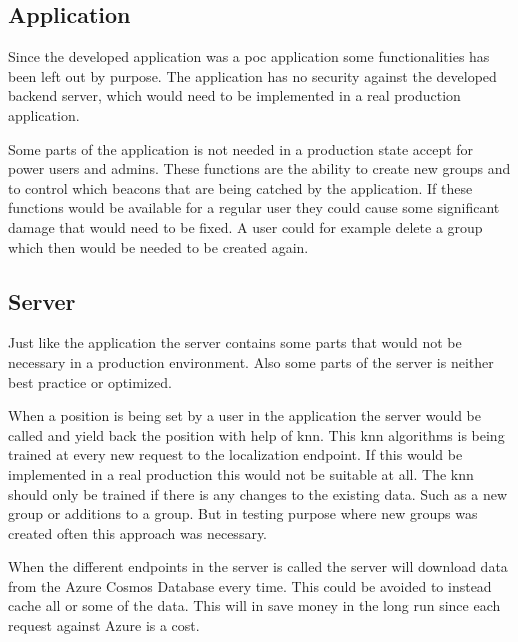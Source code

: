 \subsection{Application}\label{sec:}
Since the developed application was a \acrshort{poc} application some functionalities has been left out by purpose.
The application has no security against the developed backend server, which would need to be implemented in a real production application.

\bigskip

Some parts of the application is not needed in a production state accept for power users and admins.
These functions are the ability to create new groups and to control which beacons that are being catched by the application.
If these functions would be available for a regular user they could cause some significant damage that would need to be fixed.
A user could for example delete a group which then would be needed to be created again.

\subsection{Server}\label{sec:}
Just like the application the server contains some parts that would not be necessary in a production environment.
Also some parts of the server is neither best practice or optimized.

\bigskip

When a position is being set by a user in the application the server would be called and yield back the position with help of \acrlong{knn}.
This \acrshort{knn} algorithms is being trained at every new request to the localization endpoint.
If this would be implemented in a real production this would not be suitable at all.
The \acrshort{knn} should only be trained if there is any changes to the existing data.
Such as a new group or additions to a group.
But in testing purpose where new groups was created often this approach was necessary.

\bigskip

When the different endpoints in the server is called the server will download data from the Azure Cosmos Database every time. 
This could be avoided to instead cache all or some of the data.
This will in save money in the long run since each request against Azure is a cost.


